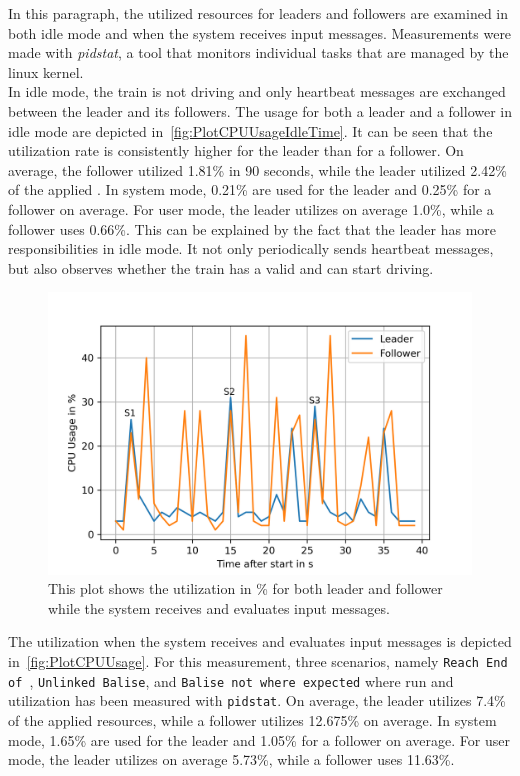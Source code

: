 In this paragraph, the utilized  resources for leaders and followers are examined in both idle mode and when the system receives input messages.
Measurements were made with \textit{pidstat}, a tool that monitors individual tasks that are managed by the linux kernel.
\\

In idle mode, the train is not driving and only heartbeat messages are exchanged between the leader and its followers.
The  usage for both a leader and a follower in idle mode are depicted in~\autoref{fig:PlotCPUUsageIdleTime}.
It can be seen that the utilization rate is consistently higher for the leader than for a follower.
On average, the follower utilized 1.81\% in 90 seconds, while the leader utilized 2.42\% of the applied .
In system mode, 0.21\% are used for the leader and 0.25\% for a follower on average.
For user mode, the leader utilizes on average 1.0\%, while a follower uses 0.66\%.
This can be explained by the fact that the leader has more responsibilities in idle mode.
It not only periodically sends heartbeat messages, but also observes whether the train has a valid  and can start driving.

\begin{figure}[!hb]
	\centering
	\includegraphics[width=0.75\linewidth]{images/plots/CPUUsage}
	\caption{This plot shows the  utilization in \% for both leader and follower while the system receives and evaluates input messages.}
	\label{fig:PlotCPUUsage}
\end{figure}

The  utilization when the system receives and evaluates input messages is depicted in~\autoref{fig:PlotCPUUsage}.
For this measurement, three scenarios, namely \texttt{Reach End of }, \texttt{Unlinked Balise}, and \texttt{Balise not where expected} where run and  utilization has been measured with \texttt{pidstat}.
On average, the leader utilizes 7.4\% of the applied  resources, while a follower utilizes 12.675\% on average.
In system mode, 1.65\% are used for the leader and 1.05\% for a follower on average.
For user mode, the leader utilizes on average 5.73\%, while a follower uses 11.63\%.

